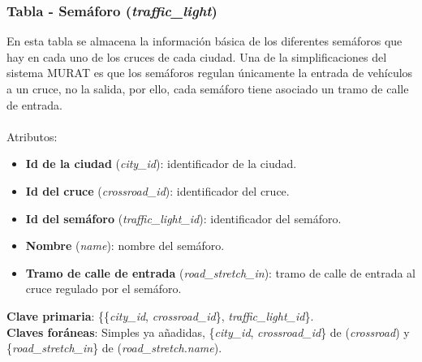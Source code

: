 \subsubsection{Tabla - Semáforo (\textit{traffic\_light})}
En esta tabla se almacena la información básica de los diferentes semáforos que hay en cada uno de los cruces de cada ciudad. Una de la simplificaciones del sistema MURAT es que los semáforos regulan únicamente la entrada de vehículos a un cruce, no la salida, por ello, cada semáforo tiene asociado un tramo de calle de entrada. \\\\
Atributos:
\begin{itemize}
    \item \textbf{Id de la ciudad} (\textit{city\_id}): identificador de la ciudad.
    \item \textbf{Id del cruce} (\textit{crossroad\_id}): identificador del cruce.
    \item \textbf{Id del semáforo} (\textit{traffic\_light\_id}): identificador del semáforo.
    \item \textbf{Nombre} (\textit{name}): nombre del semáforo.
    \item \textbf{Tramo de calle de entrada} (\textit{road\_stretch\_in}): tramo de calle de entrada al cruce regulado por el semáforo.
\end{itemize}
\textbf{Clave primaria}: \{\{\textit{city\_id}, \textit{crossroad\_id}\}, \textit{traffic\_light\_id}\}. \\
\textbf{Claves foráneas}: Simples ya añadidas, \{\textit{city\_id}, \textit{crossroad\_id}\} de (\textit{crossroad}) y \{\textit{road\_stretch\_in}\} de (\textit{road\_stretch.name}).

